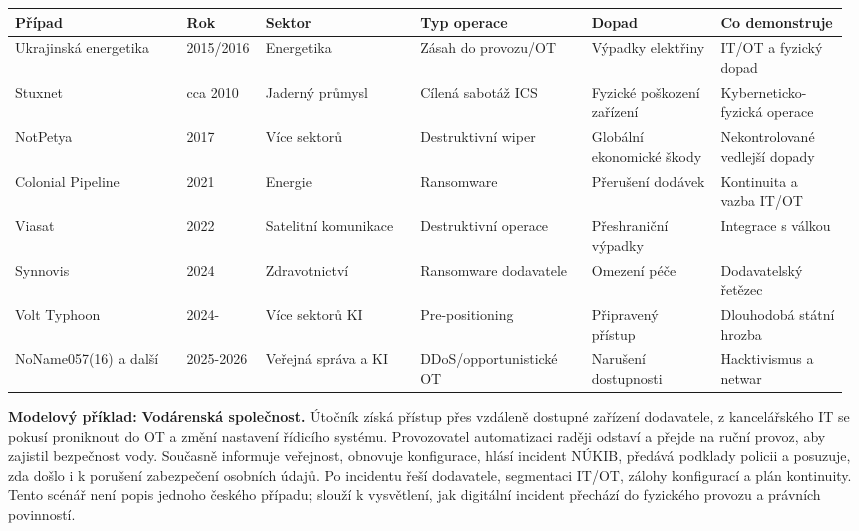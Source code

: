\documentclass[11pt,a4paper]{article}
\newcommand{\modelovy}[1]{\begin{tcolorbox}[breakable,enhanced,colback=green!7,colframe=green!30!black,boxrule=0pt,arc=1mm,left=5pt,right=5pt,top=5pt,bottom=5pt,before skip=6pt,after skip=6pt]\textbf{Modelový příklad:} #1\end{tcolorbox}}
\begin{document}
\begin{longtable}{p{0.20\linewidth}p{0.09\linewidth}p{0.18\linewidth}p{0.20\linewidth}p{0.15\linewidth}p{0.15\linewidth}}
\toprule
\textbf{Případ} & \textbf{Rok} & \textbf{Sektor} & \textbf{Typ operace} & \textbf{Dopad} & \textbf{Co demonstruje}\\
\midrule
Ukrajinská energetika & 2015/2016 & Energetika & Zásah do provozu/OT & Výpadky elektřiny & IT/OT a fyzický dopad\\
Stuxnet & cca 2010 & Jaderný průmysl & Cílená sabotáž ICS & Fyzické poškození zařízení & Kyberneticko-fyzická operace\\
NotPetya & 2017 & Více sektorů & Destruktivní wiper & Globální ekonomické škody & Nekontrolované vedlejší dopady\\
Colonial Pipeline & 2021 & Energie & Ransomware & Přerušení dodávek & Kontinuita a vazba IT/OT\\
Viasat & 2022 & Satelitní komunikace & Destruktivní operace & Přeshraniční výpadky & Integrace s válkou\\
Synnovis & 2024 & Zdravotnictví & Ransomware dodavatele & Omezení péče & Dodavatelský řetězec\\
Volt Typhoon & 2024- & Více sektorů KI & Pre-positioning & Připravený přístup & Dlouhodobá státní hrozba\\
NoName057(16) a další & 2025-2026 & Veřejná správa a KI & DDoS/opportunistické OT & Narušení dostupnosti & Hacktivismus a netwar\\
\bottomrule
\end{longtable}

\modelovy{\textbf{Vodárenská společnost.} Útočník získá přístup přes vzdáleně dostupné zařízení dodavatele, z kancelářského IT se pokusí proniknout do OT a změní nastavení řídicího systému. Provozovatel automatizaci raději odstaví a přejde na ruční provoz, aby zajistil bezpečnost vody. Současně informuje veřejnost, obnovuje konfigurace, hlásí incident NÚKIB, předává podklady policii a posuzuje, zda došlo i k porušení zabezpečení osobních údajů. Po incidentu řeší dodavatele, segmentaci IT/OT, zálohy konfigurací a plán kontinuity. Tento scénář není popis jednoho českého případu; slouží k vysvětlení, jak digitální incident přechází do fyzického provozu a právních povinností.}
\end{document}

